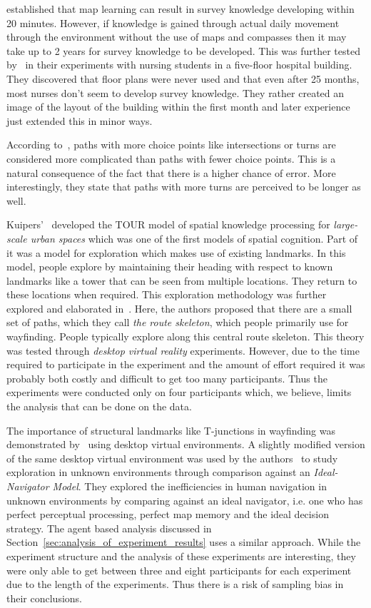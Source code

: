 \cite{Thorndyke1982560} established that map learning can result in survey knowledge developing within 20 minutes. However, if knowledge is gained through actual daily movement through the environment without the use of maps and compasses then it may take up to 2 years for survey knowledge to be developed. This was further tested by~\cite{Moeser01011988} in their experiments with nursing students in a five-floor hospital building. They discovered that floor plans were never used and that even after 25 months, most nurses don't seem to develop survey knowledge. They rather created an image of the layout of the building within the first month and later experience just extended this in minor ways.

 According to~\cite{Gopal1989309}, paths with more choice points like intersections or turns are considered more complicated than paths with fewer choice points. This is a natural consequence of the fact that there is a higher chance of error. More interestingly, they state that paths with more turns are perceived to be longer as well.

 Kuipers'~\cite{Kuipers78,Kuipers01012003} developed the TOUR model of spatial knowledge processing for \emph{large-scale urban spaces} which was one of the first models of spatial cognition. Part of it was a model for exploration which makes use of existing landmarks. In this model, people explore by maintaining their heading with respect to known landmarks like a tower that can be seen from multiple locations. They return to these locations when required. This exploration methodology was further explored and elaborated in~\cite{Kuipers01012003}. Here, the authors proposed that  there are a small set of paths, which they call \emph{the route skeleton}, which people primarily use for wayfinding. People typically explore along this central route skeleton.  This theory was tested through \emph{desktop virtual reality} experiments. However, due to the time required to participate in the experiment and the amount of effort required it was probably both costly and difficult to get too many participants. Thus the experiments were conducted only on four participants which, we believe, limits the analysis that can be done on the data.

The importance of structural landmarks like T-junctions in wayfinding was demonstrated by~\cite{stankiewicz2007acquistion} using desktop virtual environments. A slightly modified version of the same desktop virtual environment was used by the authors~\cite{stankiewicz2006lost} to study exploration in unknown environments through comparison against an \emph{Ideal-Navigator Model}. They explored the inefficiencies in human navigation in unknown environments by comparing against an ideal navigator, i.e. one who has perfect perceptual processing, perfect map memory and the ideal decision strategy. The agent based analysis discussed in Section~\ref{sec:analysis_of_experiment_results} uses a similar approach. While the experiment structure and the analysis of these experiments are interesting, they were only able to get between three and eight participants for each experiment due to the length of the experiments. Thus there is a risk of sampling bias in their conclusions.

